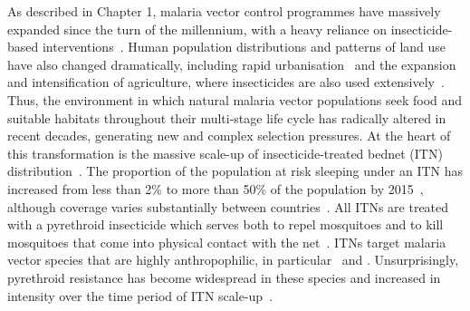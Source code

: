 \documentclass[a4paper,11pt,abstracton,hidelinks]{scrartcl}
\begin{document}
As described in Chapter 1, malaria vector control programmes have massively expanded since the turn of the millennium, with a heavy reliance on insecticide-based interventions~\parencite{Cibulskis2016,Bhatt2015,WHO2019WMR}.
%
Human population distributions and patterns of land use have also changed dramatically, including rapid urbanisation~\parencite{Awumbila2017,OECD2020} and the expansion and intensification of agriculture, where insecticides are also used extensively~\parencite{Otsuka2014,BinswangerMkhize2017,Sternberg2018}.
%
Thus, the environment in which natural malaria vector populations seek food and suitable habitats throughout their multi-stage life cycle has radically altered in recent decades, generating new and complex selection pressures.
%
At the heart of this transformation is the massive scale-up of insecticide-treated bednet (ITN) distribution~\parencite{WHO2005WIN,RBM2008GMAP,WHO2017LLIN,Bhatt2015,Okumu2020}.
%
The proportion of the population at risk sleeping under an ITN has increased from less than 2\% to more than 50\% of the population by 2015~\parencite{Cibulskis2016,Bhatt2015}, although coverage varies substantially between countries~\parencite{WHO2019WMR}.
%
All ITNs are treated with a pyrethroid insecticide which serves both to repel mosquitoes and to kill mosquitoes that come into physical contact with the net~\parencite{WHO2020PQVC,Okumu2020}.
%
ITNs target malaria vector species that are highly anthropophilic, in particular \agam\ and \acol.
%
Unsurprisingly, pyrethroid resistance has become widespread in these species and increased in intensity over the time period of ITN scale-up~\parencite{Hemingway2016,Hancock2020}.
\end{document}

